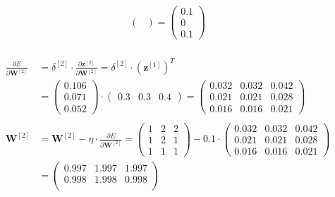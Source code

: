 \documentclass[12pt]{article}
\begin{document}
\begin{enumerate}
\begin{equation*}
\begin{aligned}
\begin{pmatrix}
        \end{pmatrix} = \begin{pmatrix}
            0.1\\
            0\\
            0.1
        \end{pmatrix}
    \end{aligned}
\end{equation*}

\begin{equation*}
    \begin{aligned}
        \\
        \frac{\partial E}{\partial \mathbf{W}^{[2]}} &= \delta^{[2]} \cdot \frac{\partial \mathbf{z}^{[2]}}{\partial \mathbf{W}^{[2]}} = \delta^{[2]} \cdot \left(\mathbf{z}^{[1]}\right)^T \\
        &= \begin{pmatrix}
            0.106\\
            0.071\\
            0.052
        \end{pmatrix} \cdot \begin{pmatrix}
            0.3 & 0.3 & 0.4
        \end{pmatrix} = \begin{pmatrix}
            0.032 & 0.032 & 0.042\\
            0.021 & 0.021 & 0.028\\
            0.016 & 0.016 & 0.021
        \end{pmatrix}\\
        \\
        \mathbf{W}^{[2]} &= \mathbf{W}^{[2]} - \eta \cdot \frac{\partial E}{\partial \mathbf{W}^{[2]}} = \begin{pmatrix}
            1 & 2 & 2\\
            1 & 2 & 1\\
            1 & 1 & 1
        \end{pmatrix} - 0.1 \cdot \begin{pmatrix}
            0.032 & 0.032 & 0.042\\
            0.021 & 0.021 & 0.028\\
            0.016 & 0.016 & 0.021
        \end{pmatrix} \\ &= \begin{pmatrix}
            0.997 & 1.997 & 1.997\\
            0.998 & 1.998 & 0.998\\

\end{pmatrix}
\end{aligned}
\end{equation*}
\end{enumerate}
\end{document}
